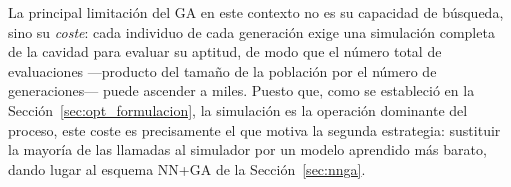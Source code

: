 La principal limitación del GA en este contexto no es su capacidad de búsqueda, sino
su \emph{coste}: cada individuo de cada generación exige una simulación completa de
la cavidad para evaluar su aptitud, de modo que el número total de evaluaciones
—producto del tamaño de la población por el número de generaciones— puede ascender
a miles. Puesto que, como se estableció en la Sección~\ref{sec:opt_formulacion}, la
simulación es la operación dominante del proceso, este coste es precisamente el que
motiva la segunda estrategia: sustituir la mayoría de las llamadas al simulador por
un modelo aprendido más barato, dando lugar al esquema NN+GA de la
Sección~\ref{sec:nnga}.









